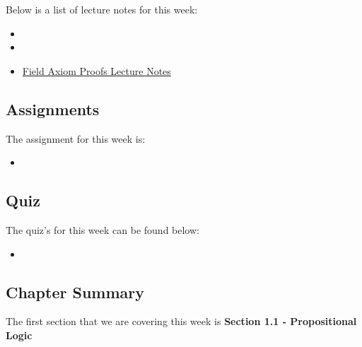 \noindent Below is a list of lecture notes for this week:

\begin{itemize}
    \item {}
    \item {}
    \item \href{https://www.stumblingrobot.com/2015/06/29/prove-consequences-of-the-field-axioms/}{Field Axiom Proofs Lecture Notes}
\end{itemize}

\subsection{Assignments}

The assignment for this week is:

\begin{itemize}
    \item {}
\end{itemize}

\subsection{Quiz}

The quiz's for this week can be found below:

\begin{itemize}
    \item {}
\end{itemize}

\newpage

\subsection{Chapter Summary}

The first section that we are covering this week is \textbf{Section 1.1 - Propositional Logic}


